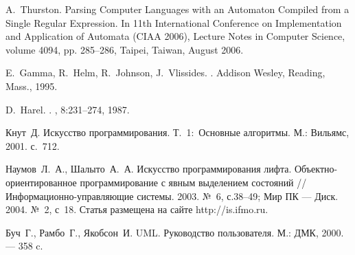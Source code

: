\documentclass[a4paper,10pt]{article}
\begin{document}
\begin{thebibliography}{99}
A.~Thurston.
Parsing Computer Languages with an Automaton Compiled from a Single Regular Expression.
In 11th International Conference on Implementation and Application of Automata (CIAA 2006), Lecture Notes in Computer Science, volume 4094, pp. 285--286, Taipei, Taiwan, August 2006.

E.~Gamma, R.~Helm, R.~Johnson, J.~Vlissides.
.
\newblock Addison Wesley, Reading, Mass., 1995.

D.~Harel.
.
, 8:231--274, 1987.

Кнут~Д.
Искусство программирования. Т.~1:~Основные алгоритмы.
М.: Вильямс, 2001. с.~712.

Наумов~Л.~А., Шалыто~А.~А.
Искусство программирования лифта. Объектно-ориентированное программирование с явным выделением состояний //Информационно-управляющие системы. 2003. №~6, с.38--49;
Мир ПК --- Диск. 2004. №~2, с~18.
Статья размещена на сайте http://is.ifmo.ru.

Буч~Г., Рамбо~Г., Якобсон~И.
UML. Руководство пользователя.
М.: ДМК, 2000. --- 358 c.

\end{thebibliography}
\end{document}
